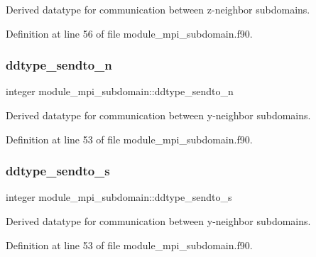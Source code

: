 Derived datatype for communication between z-\/neighbor subdomains. 



Definition at line 56 of file module\+\_\+mpi\+\_\+subdomain.\+f90.

\mbox{\label{namespacemodule__mpi__subdomain_a662c94173cf13879c5fea89a04fd8ffa}} 
\subsubsection{\texorpdfstring{ddtype\_sendto\_n}{ddtype\_sendto\_n}}
{\footnotesize\ttfamily integer module\+\_\+mpi\+\_\+subdomain\+::ddtype\+\_\+sendto\+\_\+n}



Derived datatype for communication between y-\/neighbor subdomains. 



Definition at line 53 of file module\+\_\+mpi\+\_\+subdomain.\+f90.

\mbox{\label{namespacemodule__mpi__subdomain_a8d1c7ef37ac2dca93a693c070d77638b}} 
\subsubsection{\texorpdfstring{ddtype\_sendto\_s}{ddtype\_sendto\_s}}
{\footnotesize\ttfamily integer module\+\_\+mpi\+\_\+subdomain\+::ddtype\+\_\+sendto\+\_\+s}



Derived datatype for communication between y-\/neighbor subdomains. 



Definition at line 53 of file module\+\_\+mpi\+\_\+subdomain.\+f90.

\mbox{\label{namespacemodule__mpi__subdomain_a9ca276bc5dcbfd8fcb5b8173e66dba07}} 
